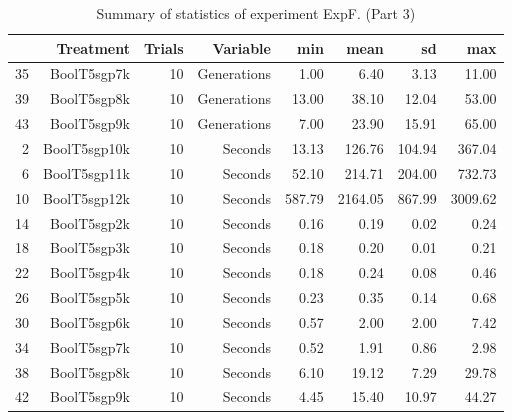 \begin{table}[ht]
\centering
\begin{tabular}{rrrrrrrr}
  \hline
 & Treatment & Trials & Variable & min & mean & sd & max \\ 
  \hline
35 & BoolT5sgp7k &  10 & Generations & 1.00 & 6.40 & 3.13 & 11.00 \\ 
  39 & BoolT5sgp8k &  10 & Generations & 13.00 & 38.10 & 12.04 & 53.00 \\ 
  43 & BoolT5sgp9k &  10 & Generations & 7.00 & 23.90 & 15.91 & 65.00 \\ 
  2 & BoolT5sgp10k &  10 & Seconds & 13.13 & 126.76 & 104.94 & 367.04 \\ 
  6 & BoolT5sgp11k &  10 & Seconds & 52.10 & 214.71 & 204.00 & 732.73 \\ 
  10 & BoolT5sgp12k &  10 & Seconds & 587.79 & 2164.05 & 867.99 & 3009.62 \\ 
  14 & BoolT5sgp2k &  10 & Seconds & 0.16 & 0.19 & 0.02 & 0.24 \\ 
  18 & BoolT5sgp3k &  10 & Seconds & 0.18 & 0.20 & 0.01 & 0.21 \\ 
  22 & BoolT5sgp4k &  10 & Seconds & 0.18 & 0.24 & 0.08 & 0.46 \\ 
  26 & BoolT5sgp5k &  10 & Seconds & 0.23 & 0.35 & 0.14 & 0.68 \\ 
  30 & BoolT5sgp6k &  10 & Seconds & 0.57 & 2.00 & 2.00 & 7.42 \\ 
  34 & BoolT5sgp7k &  10 & Seconds & 0.52 & 1.91 & 0.86 & 2.98 \\ 
  38 & BoolT5sgp8k &  10 & Seconds & 6.10 & 19.12 & 7.29 & 29.78 \\ 
  42 & BoolT5sgp9k &  10 & Seconds & 4.45 & 15.40 & 10.97 & 44.27 \\ 
   \hline
\end{tabular}
\caption{Summary of statistics of experiment ExpF. (Part 3)} 
\end{table}
